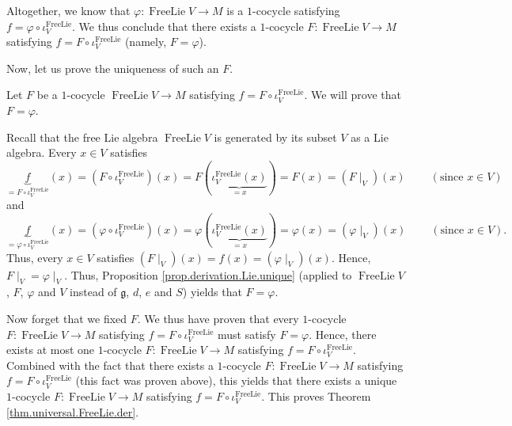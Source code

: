 \documentclass[etingof-lie.tex]{subfiles}
\begin{document}
\begin{verlong}
Altogether, we know that $\varphi:\operatorname*{FreeLie}V\rightarrow M$ is a
$1$-cocycle satisfying $f=\varphi\circ\iota_{V}^{\operatorname*{FreeLie}}$. We
thus conclude that there exists a $1$-cocycle $F:\operatorname*{FreeLie}%
V\rightarrow M$ satisfying $f=F\circ\iota_{V}^{\operatorname*{FreeLie}}$
(namely, $F=\varphi$).

Now, let us prove the uniqueness of such an $F$.

Let $F$ be a $1$-cocycle $\operatorname*{FreeLie}V\rightarrow M$ satisfying
$f=F\circ\iota_{V}^{\operatorname*{FreeLie}}$. We will prove that $F=\varphi$.

Recall that the free Lie algebra $\operatorname*{FreeLie}V$ is generated by
its subset $V$ as a Lie algebra. Every $x\in V$ satisfies%
\[
\underbrace{f}_{=F\circ\iota_{V}^{\operatorname*{FreeLie}}}\left(  x\right)
=\left(  F\circ\iota_{V}^{\operatorname*{FreeLie}}\right)  \left(  x\right)
=F\left(  \underbrace{\iota_{V}^{\operatorname*{FreeLie}}\left(  x\right)
}_{=x}\right)  =F\left(  x\right)  =\left(  F\mid_{V}\right)  \left(
x\right)  \ \ \ \ \ \ \ \ \ \ \left(  \text{since }x\in V\right)
\]
and%
\[
\underbrace{f}_{=\varphi\circ\iota_{V}^{\operatorname*{FreeLie}}}\left(
x\right)  =\left(  \varphi\circ\iota_{V}^{\operatorname*{FreeLie}}\right)
\left(  x\right)  =\varphi\left(  \underbrace{\iota_{V}%
^{\operatorname*{FreeLie}}\left(  x\right)  }_{=x}\right)  =\varphi\left(
x\right)  =\left(  \varphi\mid_{V}\right)  \left(  x\right)
\ \ \ \ \ \ \ \ \ \ \left(  \text{since }x\in V\right)  .
\]
Thus, every $x\in V$ satisfies $\left(  F\mid_{V}\right)  \left(  x\right)
=f\left(  x\right)  =\left(  \varphi\mid_{V}\right)  \left(  x\right)  $.
Hence, $F\mid_{V}=\varphi\mid_{V}$. Thus, Proposition
\ref{prop.derivation.Lie.unique} (applied to $\operatorname*{FreeLie}V$, $F$,
$\varphi$ and $V$ instead of $\mathfrak{g}$, $d$, $e$ and $S$) yields that
$F=\varphi$.

Now forget that we fixed $F$. We thus have proven that every $1$-cocycle
$F:\operatorname*{FreeLie}V\rightarrow M$ satisfying $f=F\circ\iota
_{V}^{\operatorname*{FreeLie}}$ must satisfy $F=\varphi$. Hence, there exists
at most one $1$-cocycle $F:\operatorname*{FreeLie}V\rightarrow M$ satisfying
$f=F\circ\iota_{V}^{\operatorname*{FreeLie}}$. Combined with the fact that
there exists a $1$-cocycle $F:\operatorname*{FreeLie}V\rightarrow M$
satisfying $f=F\circ\iota_{V}^{\operatorname*{FreeLie}}$ (this fact was proven
above), this yields that there exists a unique $1$-cocycle
$F:\operatorname*{FreeLie}V\rightarrow M$ satisfying $f=F\circ\iota
_{V}^{\operatorname*{FreeLie}}$. This proves Theorem
\ref{thm.universal.FreeLie.der}.
\end{verlong}
\end{document}
